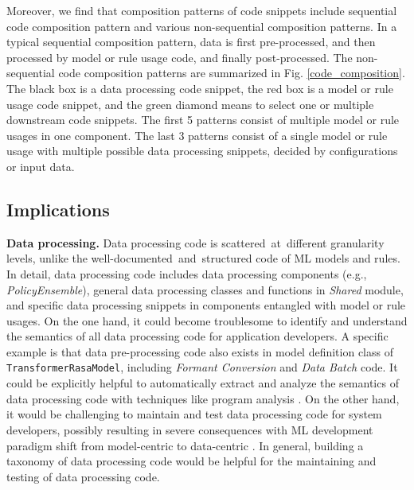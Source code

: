 Moreover, we find that composition patterns of code snippets include sequential code composition pattern and various non-sequential composition patterns.
In a typical sequential composition pattern, data is first pre-processed, and then processed by model or rule usage code, and finally post-processed.
The non-sequential code composition patterns are summarized in Fig. \ref{code_composition}. The black box is a data processing code snippet, the red box is a model or rule usage code snippet, and the green diamond means to select one or multiple downstream code snippets.
The first 5 patterns consist of multiple model or rule usages in one component. %
The last 3 patterns consist of a single model or rule usage with multiple possible data processing snippets, decided by configurations or input data.



\subsection{Implications}

\textbf{Data processing.} Data processing code is scattered~at~different granularity levels, unlike the well-documented~and~structured code of ML models and rules. 
In detail, data processing code includes data processing components (e.g., \textit{PolicyEnsemble}), general data processing classes and functions in \textit{Shared} module, and specific data processing snippets in components entangled with model or rule usages. 
On the one hand, it could become troublesome to identify and understand the semantics of all data processing code for application developers. A specific example is that data pre-processing code also exists in model definition class of \texttt{TransformerRasaModel}, including \textit{Formant Conversion} and \textit{Data Batch} code. It could be explicitly helpful to automatically extract and analyze the semantics of data processing code  with techniques like program analysis \cite{pycg}. On the other hand, it would be challenging to maintain and test data processing code for system developers, possibly resulting in severe consequences with ML development paradigm shift from model-centric  to data-centric \cite{liangAdvancesChallengesOpportunities2022}. 
In general, building a taxonomy of data processing code would be helpful for the maintaining and testing of data processing code.


